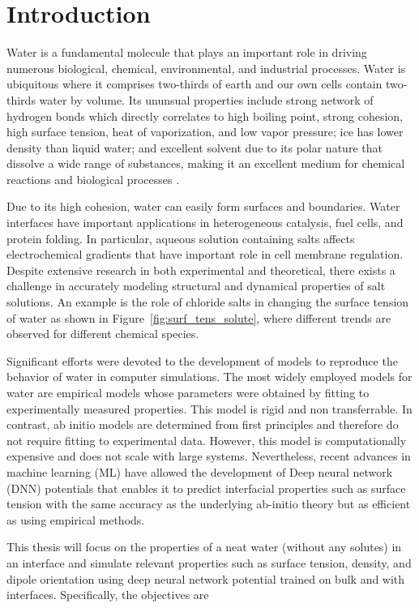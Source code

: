 \chapter{Introduction}
Water is a fundamental molecule that plays an important role  in driving
numerous biological, chemical, environmental, and industrial processes. Water
is ubiquitous where it comprises two-thirds of earth and our own cells contain
two-thirds water by volume.  Its ununsual properties include  strong network
of hydrogen bonds which directly correlates to high boiling
point,	strong cohesion,
high surface
tension, heat of vaporization, and low vapor
pressure; ice has lower density than liquid water; and excellent solvent due to
its polar nature that
dissolve a wide range of substances, making it an excellent medium for chemical
reactions and biological processes \cite{Kontogeorgis2022}.

Due to its high cohesion, water can easily form surfaces and boundaries. Water
interfaces have important applications in heterogeneous catalysis, fuel cells,
and protein folding. In particular, aqueous solution containing salts affects
electrochemical gradients  that have important role in	cell membrane
regulation. Despite extensive research in both experimental and theoretical,
there exists a challenge in accurately modeling structural and dynamical
properties of salt solutions. An example is the role of chloride salts in
changing the surface tension of water as shown in
Figure~\ref{fig:surf_tens_solute}, where different trends are observed for
different chemical species.

Significant efforts were devoted to the development of models to reproduce the
behavior of water in computer simulations. The most
widely employed models for water are empirical models whose
parameters were obtained by fitting to experimentally measured properties. This
model is rigid and non transferrable. In contrast, ab initio models are
determined from first principles and
therefore do not require fitting to experimental data. However, this model is
computationally expensive and does not scale with large systems. Nevertheless,
recent advances in machine learning (ML) have allowed the development of Deep
neural network (DNN) potentials that
enables it to predict interfacial properties such as surface tension with the
same accuracy as the underlying ab-initio theory but as efficient as using
empirical methods.

This thesis will focus on the properties of a neat water (without any
solutes) in an interface and simulate relevant properties such as surface
tension, density, and dipole orientation using deep neural network potential
trained on bulk and with interfaces. Specifically, the objectives are

